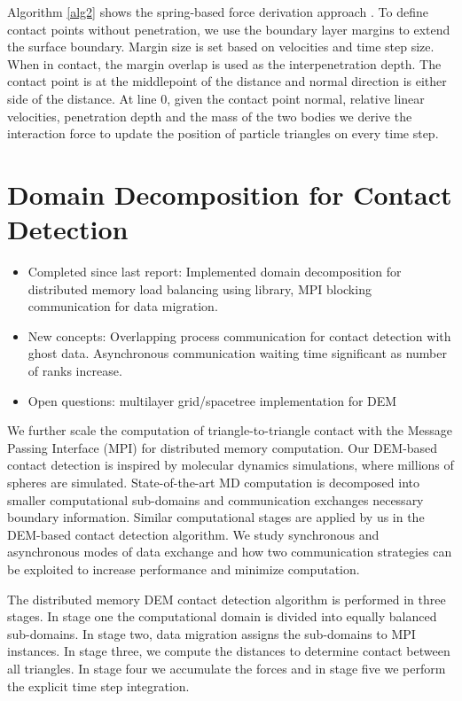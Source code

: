 \documentclass[times,12pt]{article}
\begin{document}
Algorithm \ref{alg2} shows the spring-based force derivation approach \cite{Koziara2008, solberg2000, Wachs2012, Williams1999}. To define contact points without penetration, we use the boundary layer margins to extend the surface boundary. Margin size is set based on velocities and time step size. When in contact, the margin overlap is used as the interpenetration depth. The contact point is at the middlepoint of the distance and normal direction is either side of the distance. At line 0, given the contact point normal, relative linear velocities, penetration depth and the mass of the two bodies we derive the interaction force to update the position of particle triangles on every time step.

\clearpage

\section{Domain Decomposition for Contact Detection}
\vspace{5mm}
\begin{itemize}
\item Completed since last report: Implemented domain decomposition for distributed memory load balancing using library, MPI blocking communication for data migration. 
\item New concepts: Overlapping process communication for contact detection with ghost data. Asynchronous communication waiting
time significant as number of ranks increase.
\item Open questions: multilayer grid/spacetree implementation for DEM 
\end{itemize}

We further scale the computation of triangle-to-triangle contact with the Message Passing Interface (MPI) \cite{Forum:1994:MMI:898758} for distributed memory computation. Our DEM-based contact detection is inspired by molecular dynamics simulations, where millions of spheres are simulated. State-of-the-art MD computation is decomposed into smaller computational sub-domains and communication exchanges necessary boundary information. Similar computational stages are applied by us in the DEM-based contact detection algorithm. We study synchronous and asynchronous modes of data exchange and how two communication strategies can be exploited to increase performance and minimize computation.

The distributed memory DEM contact detection algorithm is performed in three stages. In stage one the computational domain is divided into equally balanced sub-domains. In stage two, data migration assigns the sub-domains to MPI instances. In stage three, we compute the distances to determine contact between all triangles. In stage four we accumulate the forces and in stage five we perform the explicit time step integration.
\end{document}

